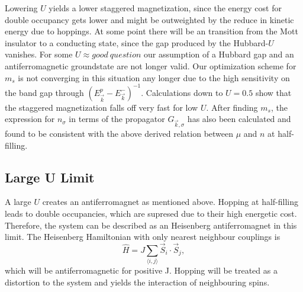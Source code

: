 \documentclass[a4paper,10pt]{report}
\begin{document}
Lowering $U$ yields a lower staggered magnetization, since the energy cost for double occupancy gets lower and might be outweighted by
the reduce in kinetic energy due to hoppings.
%
At some point there will be an transition from the Mott insulator to a conducting state, since the gap produced by the Hubbard-$U$ vanishes. 
For some $U \approx good \: question$ our assumption of a Hubbard gap and an antiferromagnetic groundstate are not longer valid. 
Our optimization scheme for $m_s$ is not converging in this situation any longer due to the high sensitivity on the band gap through $(E^p_{\vec k} - E^-_{\vec k})^{-1}$.
Calculations down to $U=0.5$ show that the staggered magnetization falls off very fast for low $U$.
After finding $m_{s}$, the expression for $n_{\sigma}$ in terms of the propagator $G_{\vec k,\sigma}$ has also been calculated and found to be consistent with 
the above derived relation between $\mu$ and $n$ at half-filling.



\subsection{Large U Limit}

A large $U$ creates an antiferromagnet as mentioned above. 
Hopping at half-filling leads to double occupancies, which are supresed due to their high energetic cost. 
Therefore, the system can be described as an Heisenberg antiferromagnet in this limit.
The Heisenberg Hamiltonian with only nearest neighbour couplings is
\begin{equation}
 \hat H = J \sum_{\langle i,j\rangle} \vec{S}_i \cdot \vec{S}_j,
\end{equation}
which will be antiferromagnetic for positive J. 
Hopping will be treated as a distortion to the system and yields the interaction of neighbouring spins.

%
%
\end{document}
